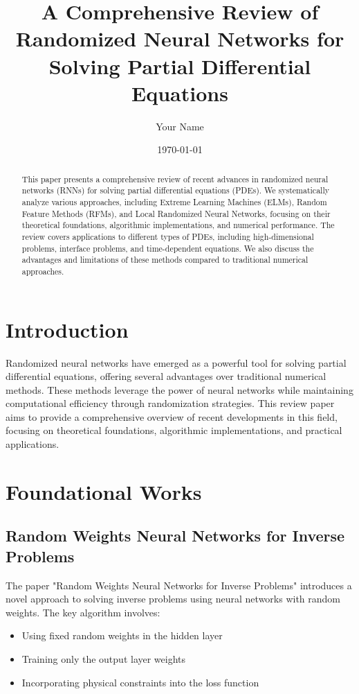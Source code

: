 \documentclass[12pt]{article}
\title{A Comprehensive Review of Randomized Neural Networks for Solving Partial Differential Equations}
\author{Your Name}
\date{\today}
\begin{document}
\maketitle

\begin{abstract}
This paper presents a comprehensive review of recent advances in randomized neural networks (RNNs) for solving partial differential equations (PDEs). We systematically analyze various approaches, including Extreme Learning Machines (ELMs), Random Feature Methods (RFMs), and Local Randomized Neural Networks, focusing on their theoretical foundations, algorithmic implementations, and numerical performance. The review covers applications to different types of PDEs, including high-dimensional problems, interface problems, and time-dependent equations. We also discuss the advantages and limitations of these methods compared to traditional numerical approaches.
\end{abstract}

\section{Introduction}
\label{sec:introduction}
Randomized neural networks have emerged as a powerful tool for solving partial differential equations, offering several advantages over traditional numerical methods. These methods leverage the power of neural networks while maintaining computational efficiency through randomization strategies. This review paper aims to provide a comprehensive overview of recent developments in this field, focusing on theoretical foundations, algorithmic implementations, and practical applications.

\section{Foundational Works}
\label{sec:foundations}

\subsection{Random Weights Neural Networks for Inverse Problems}
\label{subsec:random_weights}
The paper "Random Weights Neural Networks for Inverse Problems" introduces a novel approach to solving inverse problems using neural networks with random weights. The key algorithm involves:

\begin{itemize}
    \item Using fixed random weights in the hidden layer
    \item Training only the output layer weights
    \item Incorporating physical constraints into the loss function
\end{itemize}
\end{document}
